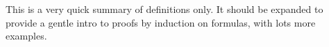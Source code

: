 \documentclass[../../../include/open-logic-chapter]{subfiles}
\begin{document}

\begin{editorial}
  This is a very quick summary of definitions only. It should be
  expanded to provide a gentle intro to proofs by induction on
  formulas, with lots more examples.
\end{editorial}







\OLEndChapterHook
\end{document}
